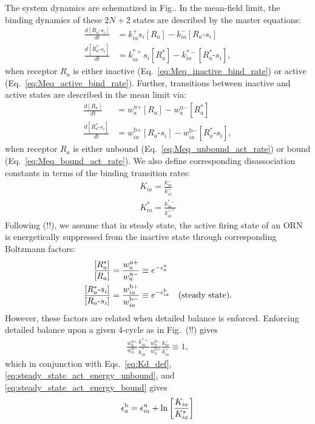 The system dynamics are schematized in Fig.. In the mean-field limit, the binding dynamics of these $2N + 2$ states are described by the master equations:
\begin{align}
\frac{d[R_a\text{-}s_i]}{dt} &= k^+_{ia}s_i[R_a] - k^-_{ia}[R_a\text{-}s_i] \label{eq:Meq_inactive_bind_rate}\\
\frac{d[R^*_a\text{-}s_i]}{dt} &= k^{*+}_{ia}s_i[R^*_a] - k^{*-}_{ia}[R^*_a\text{-}s_i],\label{eq:Meq_active_bind_rate}
\end{align}
when receptor $R_a$ is either inactive (Eq.~\ref{eq:Meq_inactive_bind_rate}) or active (Eq.~\ref{eq:Meq_active_bind_rate}). Further, transitions between inactive and active states are described in the mean limit via:
\begin{align}
\frac{d[R_a]}{dt} &= w^{\text{u}+}_a [R_a] - w^{\text{u}-}_a [R^*_a] \label{eq:Meq_unbound_act_rate}\\
\frac{d[R^*_a\text{-}s_i]}{dt} &=  w^{\text{b}+}_{ia} [R_a\text{-}s_i] - w^{\text{b}-}_{ia}  [R^*_a\text{-}s_i],
\label{eq:Meq_bound_act_rate}
\end{align}
when receptor $R_a$ is either unbound (Eq.~\ref{eq:Meq_unbound_act_rate}) or bound (Eq.~\ref{eq:Meq_bound_act_rate}). We also define corresponding disassociation constants in terms of the binding transition rates:
\begin{align}
K_{ia} = \frac{k^-_{ia}}{k^+_{ia}} \nonumber \\
K^*_{ia} = \frac{k^{*-}_{ia}}{k^{+*}_{ia}} \label{eq:Kd_def}
\end{align}
Following (!!), we assume that in steady state, the active firing state of an ORN is energetically suppressed from the inactive state through corresponding Boltzmann factors:
\begin{align}
\frac{[R^*_a]}{[R_a]} &= \frac{w^{\text{u}+}_a}{w^{\text{u}-}_a} \equiv e^{-\epsilon^{\text u}_a} \label{eq:steady_state_act_energy_unbound} \\
\frac{[R^*_a\text{-}s_i]}{[R_a\text{-}s_i]} &= \frac{w^{\text{b}+}_{ia}}{w^{\text{b}-}_{ia}} \equiv e^{-\epsilon^{\text b}_{ia}} \quad{\text{(steady state)}}\label{eq:steady_state_act_energy_bound}.
\end{align}
However, these factors are related when detailed balance is enforced. Enforcing detailed balance upon a given 4-cycle as in Fig.~(!!) gives
\begin{align}
\frac{w^{\text{u}+}_a}{w^{\text{u}-}_a}\frac{k^{*+}_{ia}}{k^{*-}_{ia}}\frac{w^{\text{b}-}_a}{w^{\text{b}+}_a}\frac{k^{-}_{ia}}{k^{+}_{ia}} \equiv 1,
\end{align}
which in conjunction with Eqs.~\ref{eq:Kd_def}, \ref{eq:steady_state_act_energy_unbound}, and \ref{eq:steady_state_act_energy_bound} gives
\begin{align}
\epsilon_a^{\text b} = \epsilon_{ia}^{\text u} + \ln\left[\frac{K_{ia}}{K^*_{ia}}\right]
\end{align}

